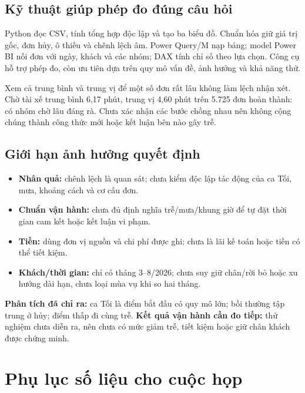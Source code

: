 \documentclass[11pt,a4paper]{article}
\begin{document}
\subsection{Kỹ thuật giúp phép đo đúng câu hỏi}
Python đọc CSV, tính tổng hợp độc lập và tạo ba biểu đồ. Chuẩn hóa giữ giá trị gốc, đơn hủy, ô thiếu và chênh lệch âm. Power Query/M nạp bảng; model Power BI nối đơn với ngày, khách và các nhóm; DAX tính chỉ số theo lựa chọn. Công cụ hỗ trợ phép đo, còn ưu tiên dựa trên quy mô vấn đề, ảnh hưởng và khả năng thử.

Xem cả trung bình và trung vị để một số đơn rất lâu không làm lệch nhận xét. Chờ tài xế trung bình 6,17 phút, trung vị 4,60 phút trên 5.725 đơn hoàn thành: có nhóm chờ lâu đáng rà. Chưa xác nhận các bước chồng nhau nên không cộng chúng thành công thức mới hoặc kết luận bên nào gây trễ.

\subsection{Giới hạn ảnh hưởng quyết định}
\begin{itemize}
\item \textbf{Nhân quả:} chênh lệch là quan sát; chưa kiểm độc lập tác động của ca Tối, mưa, khoảng cách và cơ cấu đơn.
\item \textbf{Chuẩn vận hành:} chưa đủ định nghĩa trễ/mưa/khung giờ để tự đặt thời gian cam kết hoặc kết luận vi phạm.
\item \textbf{Tiền:} dùng đơn vị nguồn và chi phí được ghi; chưa là lãi kế toán hoặc tiền có thể tiết kiệm.
\item \textbf{Khách/thời gian:} chỉ có tháng 3–8/2026; chưa suy giữ chân/rời bỏ hoặc xu hướng dài hạn, chưa loại mùa vụ khi so hai tháng.
\end{itemize}

\textbf{Phân tích đã chỉ ra:} ca Tối là điểm bắt đầu có quy mô lớn; bồi thường tập trung ở hủy; điểm thấp đi cùng trễ. \textbf{Kết quả vận hành cần đo tiếp:} thử nghiệm chưa diễn ra, nên chưa có mức giảm trễ, tiết kiệm hoặc giữ chân khách được chứng minh.

\newpage
\section{Phụ lục số liệu cho cuộc họp}
\end{document}
